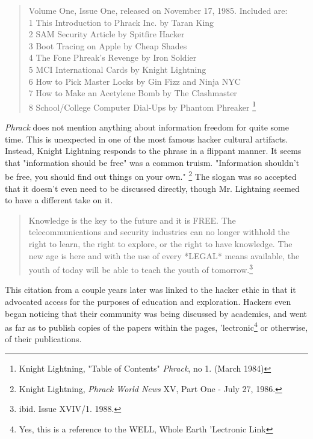 \documentclass[11pt]{article}
\begin{document}
\begin{quote}
Volume One, Issue One, released on November 17, 1985. Included 
are: \\
1 This Introduction to Phrack Inc. by Taran King\\
2 SAM Security Article by Spitfire Hacker\\
3 Boot Tracing on Apple by Cheap Shades \\
4 The Fone Phreak's Revenge by Iron Soldier \\
5 MCI International Cards by Knight Lightning \\
6 How to Pick Master Locks by Gin Fizz and Ninja NYC \\
7 How to Make an Acetylene Bomb by The Clashmaster \\
8 School/College Computer Dial-Ups by Phantom Phreaker
\footnote{Knight Lightning, "Table of Contents" \emph{Phrack}, no 1. (March 1984)}
\\
\end{quote}

\emph{Phrack} does not mention anything about information freedom for quite some time. This is unexpected in one of the most famous hacker cultural artifacts. Instead, Knight Lightning responds to the phrase in a flippant manner. It seems that "information should be free" was a common truism. "Information shouldn't be free, you should find out things on your own."
\footnote{Knight Lightning, \emph{Phrack World News} XV, Part One -  July 27, 1986.}
The slogan was so accepted that it doesn't even need to be discussed directly, though Mr. Lightning seemed to have a different take on it.

\begin{quote}Knowledge is the key to the future and it is FREE. The telecommunications and
security industries can no longer withhold the right to learn, the right to
explore, or the right to have knowledge. The new age is here and with the use
of every *LEGAL* means available, the youth of today will be able to teach the
youth of tomorrow.\footnote{ibid. Issue XVIV/1. 1988.}\end{quote}

This citation from a couple years later was linked to the hacker ethic in that it advocated access for the purposes of education and exploration. Hackers even began noticing that their community was being discussed by academics, and went as far as to publish copies of the papers within the pages, 'lectronic\footnote{Yes, this is a reference to the WELL, Whole Earth 'Lectronic Link} or otherwise, of their publications.
\end{document}
